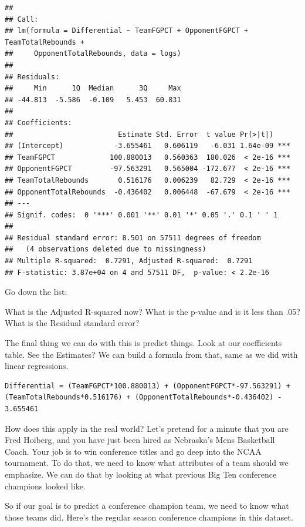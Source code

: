 \documentclass[
]{book}
\begin{document}
\begin{verbatim}
## 
## Call:
## lm(formula = Differential ~ TeamFGPCT + OpponentFGPCT + TeamTotalRebounds + 
##     OpponentTotalRebounds, data = logs)
## 
## Residuals:
##     Min      1Q  Median      3Q     Max 
## -44.813  -5.586  -0.109   5.453  60.831 
## 
## Coefficients:
##                         Estimate Std. Error  t value Pr(>|t|)    
## (Intercept)            -3.655461   0.606119   -6.031 1.64e-09 ***
## TeamFGPCT             100.880013   0.560363  180.026  < 2e-16 ***
## OpponentFGPCT         -97.563291   0.565004 -172.677  < 2e-16 ***
## TeamTotalRebounds       0.516176   0.006239   82.729  < 2e-16 ***
## OpponentTotalRebounds  -0.436402   0.006448  -67.679  < 2e-16 ***
## ---
## Signif. codes:  0 '***' 0.001 '**' 0.01 '*' 0.05 '.' 0.1 ' ' 1
## 
## Residual standard error: 8.501 on 57511 degrees of freedom
##   (4 observations deleted due to missingness)
## Multiple R-squared:  0.7291,	Adjusted R-squared:  0.7291 
## F-statistic: 3.87e+04 on 4 and 57511 DF,  p-value: < 2.2e-16
\end{verbatim}

Go down the list:

What is the Adjusted R-squared now?
What is the p-value and is it less than .05?
What is the Residual standard error?

The final thing we can do with this is predict things. Look at our coefficients table. See the Estimates? We can build a formula from that, same as we did with linear regressions.

\begin{verbatim}
Differential = (TeamFGPCT*100.880013) + (OpponentFGPCT*-97.563291) + (TeamTotalRebounds*0.516176) + (OpponentTotalRebounds*-0.436402) - 3.655461
\end{verbatim}

How does this apply in the real world? Let's pretend for a minute that you are Fred Hoiberg, and you have just been hired as Nebraska's Mens Basketball Coach. Your job is to win conference titles and go deep into the NCAA tournament. To do that, we need to know what attributes of a team should we emphasize. We can do that by looking at what previous Big Ten conference champions looked like.

So if our goal is to predict a conference champion team, we need to know what those teams did. Here's the regular season conference champions in this dataset.
\end{document}
